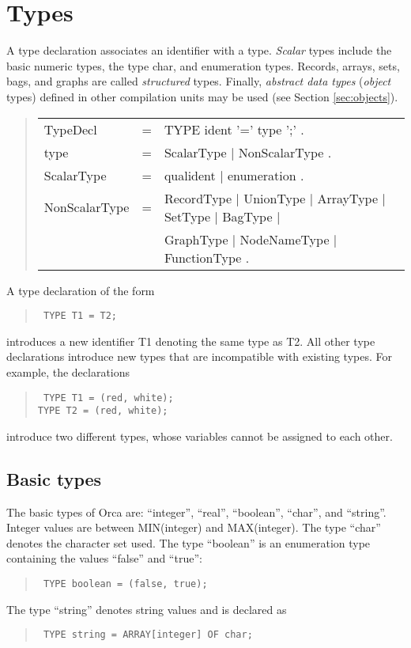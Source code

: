 \documentclass[10pt]{article}
\newenvironment{grammar}
{\begin{quote} \begin{tabular}{p{3.8cm} l l}}
{\end{tabular}\end{quote}}
\begin{document}
\section{Types}

A type declaration associates an identifier with a type.
{\em Scalar} types include the basic numeric types, the type char,
and enumeration types.
Records, arrays, sets, bags, and graphs are called {\em structured} types.
Finally, {\em abstract data types} ({\em object} types) defined
in other compilation units may be used (see Section \ref{sec:objects}).
\begin{grammar}
TypeDecl & = & TYPE ident '=' type ';' . \\
type & = & ScalarType $|$ NonScalarType . \\
ScalarType & = & qualident $|$ enumeration . \\
NonScalarType & = &  RecordType $|$ UnionType $|$ ArrayType $|$ SetType $|$ BagType $|$ \\
& & GraphType $|$ NodeNameType $|$  FunctionType .
\end{grammar}

A type declaration of the form
\begin{quote}\tt
TYPE T1 = T2;
\end{quote}
introduces a new identifier T1 denoting the same type as T2.
All other type declarations introduce new types that are incompatible
with existing types.
For example, the declarations
\begin{quote}\tt
TYPE T1 = (red, white); \\
TYPE T2 = (red, white);
\end{quote}
introduce two different types, whose variables cannot
be assigned to each other.
\subsection{Basic types}\label{sec:basic_types}

The basic types of Orca are: ``integer'', ``real'', ``boolean'', ``char'',
and ``string''.
Integer values are between MIN(integer) and MAX(integer).
The type ``char'' denotes the character set used.
The type ``boolean'' is an enumeration type containing
the values ``false'' and ``true'':
\begin{quote}\tt
TYPE boolean = (false, true);
\end{quote}
The type ``string'' denotes string values and is declared as
\begin{quote}\tt
TYPE string = ARRAY[integer] OF char;
\end{quote}
\end{document}

